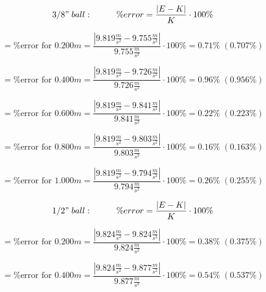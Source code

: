 \begin{equation*}
  3/8" \; ball: \hspace{1cm} \%error = \frac{|E - K|}{K} \cdot 100\%
\end{equation*}

\begin{equation*}
  = \text{\%error for 0.200$m$} = \frac{|9.819\frac{m}{s^2} - 9.755\frac{m}{s^2}|}{9.755\frac{m}{s^2}} \cdot 100\% = 0.71\% \; (0.707\%)
\end{equation*}

\begin{equation*}
  = \text{\%error for 0.400$m$} = \frac{|9.819\frac{m}{s^2} - 9.726\frac{m}{s^2}|}{9.726\frac{m}{s^2}} \cdot 100\% = 0.96\% \; (0.956\%)
\end{equation*}

\begin{equation*}
  = \text{\%error for 0.600$m$} = \frac{|9.819\frac{m}{s^2} - 9.841\frac{m}{s^2}|}{9.841\frac{m}{s^2}} \cdot 100\% = 0.22\% \; (0.223\%)
\end{equation*}

\begin{equation*}
  = \text{\%error for 0.800$m$} = \frac{|9.819\frac{m}{s^2} - 9.803\frac{m}{s^2}|}{9.803\frac{m}{s^2}} \cdot 100\% = 0.16\% \; (0.163\%)
\end{equation*}

\begin{equation*}
  = \text{\%error for 1.000$m$} = \frac{|9.819\frac{m}{s^2} - 9.794\frac{m}{s^2}|}{9.794\frac{m}{s^2}} \cdot 100\% = 0.26\% \; (0.255\%)
\end{equation*}


\begin{equation*}
  1/2" \; ball: \hspace{1cm} \%error = \frac{|E - K|}{K} \cdot 100\%
\end{equation*}

\begin{equation*}
  = \text{\%error for 0.200$m$} = \frac{|9.824\frac{m}{s^2} - 9.824\frac{m}{s^2}|}{9.824\frac{m}{s^2}} \cdot 100\% = 0.38\% \; (0.375\%)
\end{equation*}

\begin{equation*}
  = \text{\%error for 0.400$m$} = \frac{|9.824\frac{m}{s^2} - 9.877\frac{m}{s^2}|}{9.877\frac{m}{s^2}} \cdot 100\% = 0.54\% \; (0.537\%)
\end{equation*}

